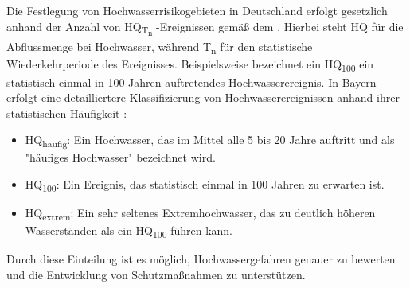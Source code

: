Die Festlegung von Hochwasserrisikogebieten in Deutschland erfolgt gesetzlich anhand der Anzahl von HQ\textsubscript{T\textsubscript{n} }-Ereignissen gemäß dem \textcite{WHG73}. Hierbei steht HQ für die Abflussmenge bei Hochwasser, während T\textsubscript{n} für den statistische Wiederkehrperiode des Ereignisses. Beispielsweise bezeichnet ein HQ\textsubscript{100} ein statistisch einmal in 100 Jahren auftretendes Hochwasserereignis.
In Bayern erfolgt eine detailliertere Klassifizierung von Hochwasserereignissen anhand ihrer statistischen Häufigkeit \autocite{BayLfU2019}:
\begin{itemize}
\item HQ\textsubscript{häufig}: Ein Hochwasser, das im Mittel alle 5 bis 20 Jahre auftritt und als "häufiges Hochwasser" bezeichnet wird.
\item HQ\textsubscript{100}: Ein Ereignis, das statistisch einmal in 100 Jahren zu erwarten ist.
\item HQ\textsubscript{extrem}: Ein sehr seltenes Extremhochwasser, das zu deutlich höheren Wasserständen als ein HQ\textsubscript{100} führen kann.
\end{itemize}
Durch diese Einteilung ist es möglich, Hochwassergefahren genauer zu bewerten und die Entwicklung von Schutzmaßnahmen zu unterstützen.